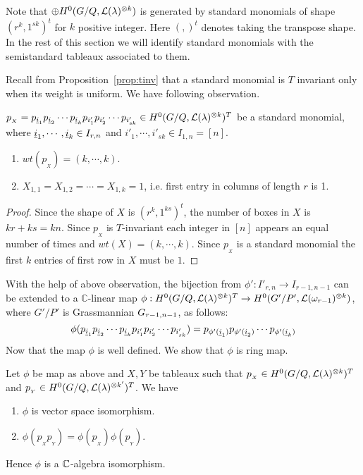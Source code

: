 Note that \(\oplus H^0(G/Q,{\cal L}(\lambda)^{\otimes k})\) is generated by standard monomials of shape \((r^k,1^{sk})^t\) for \(k\) positive integer. Here $(,)^t$ denotes taking the transpose shape.  In the rest of this section we will identify standard monomials with the semistandard tableaux associated to them.

Recall from Proposition~\ref{prop:tinv} that a standard monomial is $T$ invariant only when its weight is uniform. We have following observation.

\begin{observation}
    \(p_{_X} = p_{{\underline i}_1}p_{{\underline i}_2}\cdots p_{{\underline i}_k} p_{i'_1}p_{i'_2}\cdots p_{i'_{sk}} \in H^0(G/Q,{\cal L}(\lambda)^{\otimes k})^T\) be a standard monomial, where \({\underline i}_1,\cdots,{\underline i}_k \in I_{r,n}\) and \(i'_1,\cdots, i'_{sk} \in I_{1,n} = [n]\).
\begin{enumerate}
    \item \(wt(p_{_X}) = (k,\cdots,k)\).
    \item \(X_{1,1} = X_{1,2} = \cdots = X_{1,k} = 1\), i.e. first entry in columns of length \(r\) is 1.
\end{enumerate}
\end{observation}
\begin{proof}
    Since the shape of \(X\) is \((r^k,1^{ks})^t\), the number of boxes in \(X\) is \(kr+ks=kn\). Since \(p_{_X}\) is \(T\)-invariant each integer in \([n]\) appears an equal number of times and \(wt(X) = (k,\cdots,k)\). Since \(p_{_X}\) is a standard monomial the first \(k\) entries of first row in $X$ must be \(1\).
\end{proof}
With the help of above observation, the bijection from \(\phi':I'_{r,n}\to I_{r-1,n-1}\) can be extended to a ${\mathbb C}$-linear map \(\phi:H^0(G/Q,{\cal L}(\lambda)^{\otimes k})^T \to H^0(G'/P',{\cal L}(\omega_{r-1})^{\otimes k})\), where \(G'/P'\) is Grassmannian \(G_{{r-1},{n-1}}\), as follows:
    \[\phi(p_{{\underline i}_1}p_{{\underline i}_2}\cdots p_{{\underline i}_k} p_{i'_1}p_{i'_2}\cdots p_{i'_{sk}})
    = p_{\phi'({\underline i}_1)}p_{\phi'({\underline i}_2)}\cdots p_{\phi'({\underline i}_k)}\] 
Now that the map \(\phi\) is well defined. We show that \(\phi\) is ring map.
\begin{lemma}
    Let \(\phi\) be map as above and \(X,Y\) be tableaux such that
    \(p_{_X} \in H^0(G/Q,{\cal L}(\lambda)^{\otimes k})^T\) 
    and \(p_{_Y} \in H^0(G/Q,{\cal L}(\lambda)^{\otimes k'})^T\). 
    We have
    \begin{enumerate}
        \item \(\phi\) is vector space isomorphism.
        \item \(\phi(p_{_X}p_{_Y}) = \phi(p_{_X})\phi(p_{_Y})\).
    \end{enumerate}
    Hence \(\phi\) is a \(\mathbb{C}\)-algebra isomorphism.
\end{lemma}
